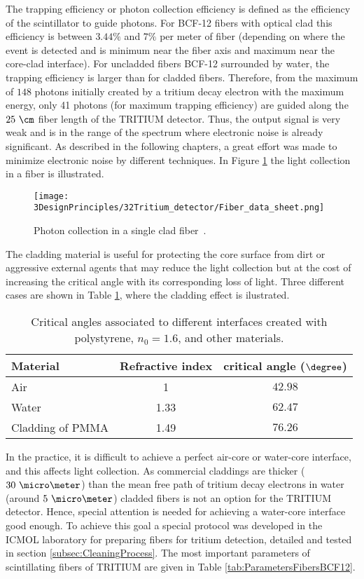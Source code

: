 The trapping efficiency or photon collection efficiency is defined as the efficiency of the scintillator to guide photons. For BCF-12 fibers with optical clad this efficiency is between $3.44\%$ and $7\%$ per meter of fiber (depending on where the event is detected and is minimum near the fiber axis  and maximum near the core-clad interface). For uncladded fibers BCF-12 surrounded by water, the trapping efficiency is larger than for cladded fibers. Therefore, from the maximum of $148$ photons initially created by a tritium decay electron with the maximum energy, only 41 photons (for maximum trapping efficiency) are guided along the $25~\cm$ fiber length of the TRITIUM detector. Thus, the output signal is very weak and is in the range of the spectrum where electronic noise is already significant. As described in the following chapters, a great effort was made to minimize electronic noise by different techniques. In Figure \ref{fig:Fiber_physic} the light collection in a fiber is illustrated.

\begin{figure}[htbp]
\centering
\texttt{[image: 3DesignPrinciples/32Tritium\_detector/Fiber\_data\_sheet.png]}
\caption{Photon collection in a single clad fiber\label{fig:Fiber_physic}~\cite{DataSheetBCF12Fiber}.}
\end{figure}

The cladding material is useful for protecting the core surface from dirt or aggressive external agents that may reduce the light collection but at the cost of increasing the critical angle with its corresponding loss of light. Three different cases are shown in Table \ref{tab:CriticalAngles}, where the cladding effect is ilustrated.

\begin{table}[htbp]
\centering{}%
\begin{tabular}{lcc}
\toprule 
Material & Refractive index & critical angle ($\degree$) \tabularnewline
\midrule
\midrule 
Air & 1 & $42.98$ \tabularnewline
Water & 1.33 & $62.47$ \tabularnewline
Cladding of PMMA & 1.49 & $76.26$ \tabularnewline
\bottomrule
\end{tabular}
\caption{Critical angles associated to different interfaces created with polystyrene, $n_0=1.6$, and other materials.}
\label{tab:CriticalAngles}
\end{table}

In the practice, it is difficult to achieve a perfect air-core or water-core interface, and this affects light collection. As commercial claddings are thicker ($30~\micro \meter$) than the mean free path of tritium decay electrons in water (around $5~\micro\meter$) cladded fibers is not an option for the TRITIUM detector. Hence, special attention is needed for achieving a water-core interface good enough. To achieve this goal a special protocol was developed in the ICMOL laboratory for preparing fibers for tritium detection, detailed and tested in section \ref{subsec:CleaningProcess}. The most important parameters of scintillating fibers of TRITIUM are given in Table \ref{tab:ParametersFibersBCF12}.

